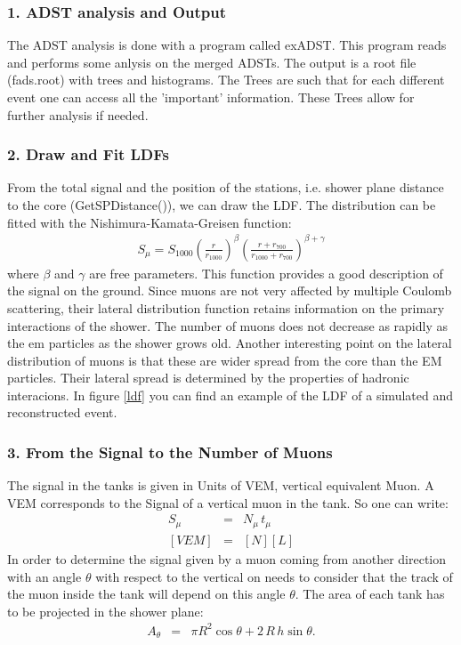 \documentclass[12pt,a4paper,oneside]{book}
\begin{document}
\subsubsection{1. ADST analysis and Output}
The ADST analysis is done with a program called exADST. This program reads and performs some anlysis on the merged ADSTs. The output is a root file (fads.root) with trees and histograms. The Trees are such that for each different event one can access all the 'important' information. These Trees allow for further analysis if needed.

\subsubsection{2. Draw and Fit LDFs}
From the total signal and the position of the stations, i.e. shower plane distance to the core (GetSPDistance()), we can draw the LDF. The distribution can be fitted with the Nishimura-Kamata-Greisen function:
\begin{eqnarray}
S_{\mu}  =  S_{1000}\left(  \frac{r}{r_{1000}}  \right)^{\beta}\left(  \frac{r+r_{700}}{r_{1000}+r_{700}}  \right)^{\beta+\gamma}
\end{eqnarray}where $\beta$ and $\gamma$ are free parameters. This function provides a good description of the signal on the ground. Since muons are not very affected by multiple Coulomb scattering, their lateral distribution function retains information on the primary interactions of the shower. The number of muons does not decrease as rapidly as the em particles as the shower grows old. Another interesting point on the lateral distribution of muons is that these are wider spread from the core than the EM particles. Their lateral spread is determined by the properties of hadronic interacions. In figure \ref{ldf} you can find an example of the LDF of a simulated and reconstructed event.





\subsubsection{3. From the Signal to the Number of Muons}
The signal in the tanks is given in Units of VEM, vertical equivalent Muon. A VEM corresponds to the Signal of a vertical muon in the tank. So one can write:\begin{eqnarray}
S_{\mu} &=& N_{\mu} \, t_{\mu}\\
\left[  VEM  \right] &=& \left[  N  \right]  \left[  L  \right]
\end{eqnarray}
In order to determine the signal given by a muon coming from another direction with an angle $\theta$ with respect to the vertical on needs to consider that the track of the muon inside the tank will depend on this angle $\theta$. The area of each tank has to be projected in the shower plane:\begin{eqnarray}
A_{\theta} &=& \pi R^2 \cos{\theta} + 2\,R\,h\sin{\theta}.
\end{eqnarray}
\end{document}
